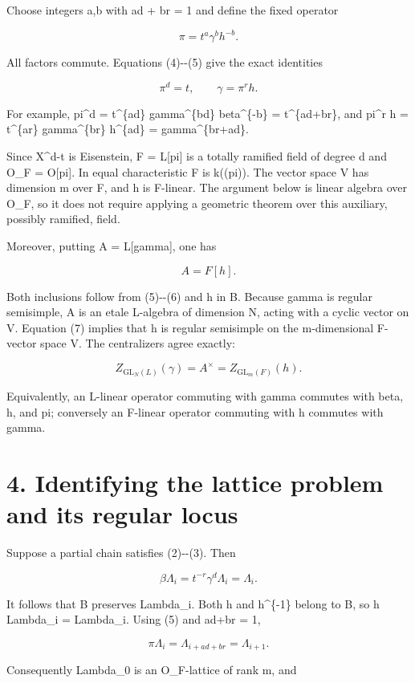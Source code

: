 \documentclass[11pt,a4paper]{article}
\begin{document}
Choose integers a,b with ad + br = 1 and define the fixed operator

\[
 \pi=t^a\gamma^b h^{-b}.
 \tag{5}
\]

All factors commute. Equations (4)-\/-(5) give the exact identities

\[
 \boxed{\pi^d=t,\qquad\gamma=\pi^r h.}
 \tag{6}
\]

For example, pi\^{}d = t\^{}\{ad\} gamma\^{}\{bd\} beta\^{}\{-b\} =
t\^{}\{ad+br\}, and pi\^{}r h = t\^{}\{ar\} gamma\^{}\{br\} h\^{}\{ad\}
= gamma\^{}\{br+ad\}.

Since X\^{}d-t is Eisenstein, F = L{[}pi{]} is a totally ramified field
of degree d and O\_F = O{[}pi{]}. In equal characteristic F is k((pi)).
The vector space V has dimension m over F, and h is F-linear. The
argument below is linear algebra over O\_F, so it does not require
applying a geometric theorem over this auxiliary, possibly ramified,
field.

Moreover, putting A = L{[}gamma{]}, one has

\[
 A=F[h].
 \tag{7}
\]

Both inclusions follow from (5)-\/-(6) and h in B. Because gamma is
regular semisimple, A is an etale L-algebra of dimension N, acting with
a cyclic vector on V. Equation (7) implies that h is regular semisimple
on the m-dimensional F-vector space V. The centralizers agree exactly:

\[
 Z_{\mathrm{GL}_N(L)}(\gamma)
 =A^\times
 =Z_{\mathrm{GL}_m(F)}(h).
 \tag{8}
\]

Equivalently, an L-linear operator commuting with gamma commutes with
beta, h, and pi; conversely an F-linear operator commuting with h
commutes with gamma.

\section{4. Identifying the lattice problem and its regular
locus}\label{identifying-the-lattice-problem-and-its-regular-locus}

Suppose a partial chain satisfies (2)-\/-(3). Then

\[
 \beta\Lambda_i=t^{-r}\gamma^d\Lambda_i=\Lambda_i.
\]

It follows that B preserves Lambda\_i. Both h and h\^{}\{-1\} belong to
B, so h Lambda\_i = Lambda\_i. Using (5) and ad+br = 1,

\[
 \pi\Lambda_i=\Lambda_{i+ad+br}=\Lambda_{i+1}.
 \tag{9}
\]

Consequently Lambda\_0 is an O\_F-lattice of rank m, and
\end{document}
